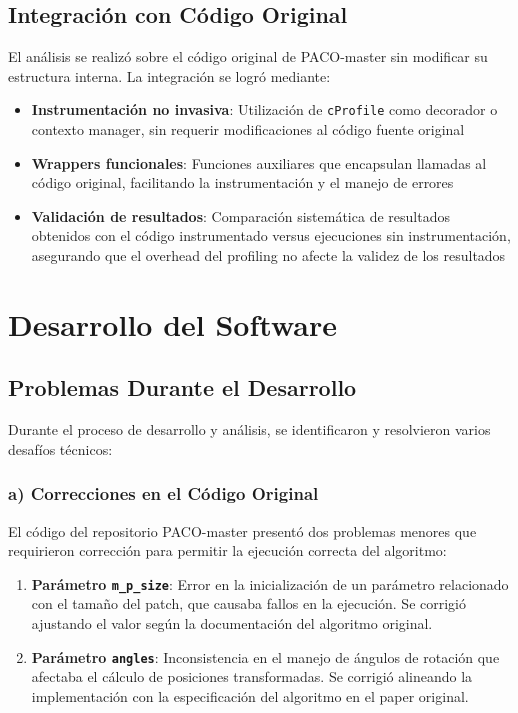 \subsection{Integración con Código Original}

El análisis se realizó sobre el código original de PACO-master sin modificar su estructura interna. La integración se logró mediante:

\begin{itemize}
    \item \textbf{Instrumentación no invasiva}: Utilización de \texttt{cProfile} como decorador o contexto manager, sin requerir modificaciones al código fuente original
    \item \textbf{Wrappers funcionales}: Funciones auxiliares que encapsulan llamadas al código original, facilitando la instrumentación y el manejo de errores
    \item \textbf{Validación de resultados}: Comparación sistemática de resultados obtenidos con el código instrumentado versus ejecuciones sin instrumentación, asegurando que el overhead del profiling no afecte la validez de los resultados
\end{itemize}

\section{Desarrollo del Software}

\subsection{Problemas Durante el Desarrollo}

Durante el proceso de desarrollo y análisis, se identificaron y resolvieron varios desafíos técnicos:

\subsubsection{a) Correcciones en el Código Original}

El código del repositorio PACO-master presentó dos problemas menores que requirieron corrección para permitir la ejecución correcta del algoritmo:

\begin{enumerate}
    \item \textbf{Parámetro \texttt{m\_p\_size}}: Error en la inicialización de un parámetro relacionado con el tamaño del patch, que causaba fallos en la ejecución. Se corrigió ajustando el valor según la documentación del algoritmo original.
    \item \textbf{Parámetro \texttt{angles}}: Inconsistencia en el manejo de ángulos de rotación que afectaba el cálculo de posiciones transformadas. Se corrigió alineando la implementación con la especificación del algoritmo en el paper original.
\end{enumerate}

